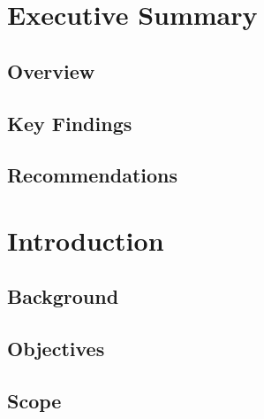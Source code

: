 \tableofcontents
\cleardoublepage
\listoffigures
\cleardoublepage
\listoftables
\cleardoublepage


\chapter{Executive Summary}
\cleardoublepage

\section{Overview}

\section{Key Findings}

\section{Recommendations}


\chapter{Introduction}
\cleardoublepage

\section{Background}

\section{Objectives}

\section{Scope}


